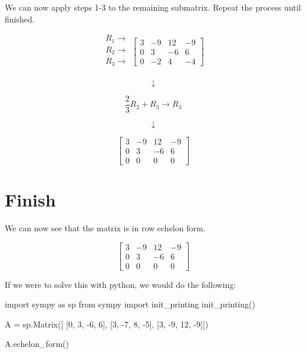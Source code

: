 \documentclass[
  letterpaper,
  DIV=11,
  numbers=noendperiod]{scrreprt}
\newenvironment{Shaded}{\begin{snugshade}}{\end{snugshade}}
\newcommand{\DecValTok}[1]{\textcolor[rgb]{0.68,0.00,0.00}{#1}}
\newcommand{\ImportTok}[1]{\textcolor[rgb]{0.00,0.46,0.62}{#1}}
\newcommand{\NormalTok}[1]{\textcolor[rgb]{0.00,0.23,0.31}{#1}}
\newcommand{\OperatorTok}[1]{\textcolor[rgb]{0.37,0.37,0.37}{#1}}
\begin{document}
We can now apply steps 1-3 to the remaining submatrix. Repeat the
process until finished.

\[
\begin{array}{c}
    R_1 \rightarrow \\
    R_2 \rightarrow \\
    R_3 \rightarrow \\
\end{array}
\begin{bmatrix}
    3 & -9 & 12 & -9 \\
    0 & 3 & -6 & 6 \\
    0 & -2 & 4 & -4
\end{bmatrix}
\]

\[
\downarrow
\]

\[
\frac{2}{3}R_2 + R_3 \rightarrow R_3
\]

\[
\downarrow
\]

\[
\begin{bmatrix}
    3 & -9 & 12 & -9 \\
    0 & 3 & -6 & 6 \\
    0 & 0 & 0 & 0
\end{bmatrix}
\]

\chapter{Finish}

We can now see that the matrix is in row echelon form.

\[
\begin{bmatrix}
    3 & -9 & 12 & -9 \\
    0 & 3 & -6 & 6 \\
    0 & 0 & 0 & 0
\end{bmatrix}
\]

If we were to solve this with python, we would do the following:

\begin{Shaded}
\begin{Highlighting}[]
\ImportTok{import}\NormalTok{ sympy }\ImportTok{as}\NormalTok{ sp  }
\ImportTok{from}\NormalTok{ sympy }\ImportTok{import}\NormalTok{ init\_printing}
\NormalTok{init\_printing()}

\NormalTok{A }\OperatorTok{=}\NormalTok{ sp.Matrix([}
\NormalTok{    [}\DecValTok{0}\NormalTok{,  }\DecValTok{3}\NormalTok{,  }\OperatorTok{{-}}\DecValTok{6}\NormalTok{,   }\DecValTok{6}\NormalTok{], }
\NormalTok{    [}\DecValTok{3}\NormalTok{, }\OperatorTok{{-}}\DecValTok{7}\NormalTok{,   }\DecValTok{8}\NormalTok{,  }\OperatorTok{{-}}\DecValTok{5}\NormalTok{], }
\NormalTok{    [}\DecValTok{3}\NormalTok{, }\OperatorTok{{-}}\DecValTok{9}\NormalTok{,  }\DecValTok{12}\NormalTok{,  }\OperatorTok{{-}}\DecValTok{9}\NormalTok{]])}

\NormalTok{A.echelon\_form()}
\end{Highlighting}
\end{Shaded}
\end{document}
